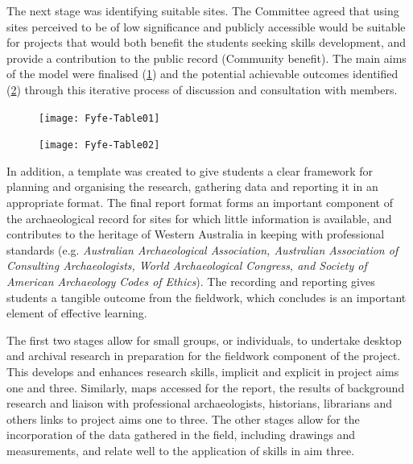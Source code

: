 \documentclass[%
]{ijsra}
\begin{document}
	The next stage was identifying suitable sites. The Committee agreed that using sites perceived to be of low significance and publicly accessible would be suitable for projects that would both benefit the students seeking skills development, and provide a contribution to the public record (Community benefit). 
	The main aims of the model were finalised (\cref{fig:Fyfe-Table01}) and the potential achievable outcomes identified (\cref{fig:Fyfe-Table02}) through this iterative process of discussion and consultation with members.
	
	\begin{figure}[!htb] %
		\texttt{[image: Fyfe-Table01]}
		\centering
		\label{fig:Fyfe-Table01}
	\end{figure}	
	
	\begin{figure}[!htb] %
		\texttt{[image: Fyfe-Table02]}
		\centering
		\label{fig:Fyfe-Table02}
	\end{figure}
	
	In addition, a template was created to give students a clear framework for planning and organising the research, gathering data and reporting it in an appropriate format. 
	The final report format forms an important component of the archaeological record for sites for which little information is available, and contributes to the heritage of Western Australia in keeping with professional standards (e.g. \emph{Australian Archaeological Association, Australian Association of Consulting Archaeologists, World Archaeological Congress, and Society of American Archaeology Codes of Ethics}). 
	The recording and reporting gives students a tangible outcome from the fieldwork, which \textcite[113-116]{mytum2012c} concludes is an important element of effective learning.
	
	The first two stages allow for small groups, or individuals, to undertake desktop and archival research in preparation for the fieldwork component of the project. 
	This develops and enhances research skills, implicit and explicit in project aims one and three. Similarly, maps accessed for the report, the results of background research and liaison with professional archaeologists, historians, librarians and others links to project aims one to three. 
	The other stages allow for the incorporation of the data gathered in the field, including drawings and measurements, and relate well to the application of skills in aim three.
	
\end{document}
